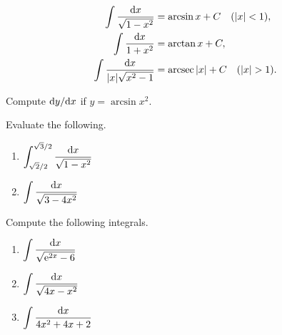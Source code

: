 \begin{corollary}
\begin{align}
\int \frac{\dee x}{\sqrt{1-x^2}} &= \arcsin x + C\quad (|x|<1),\\
\int \frac{\dee x}{1+x^2} &= \arctan x + C,\\
\int \frac{\dee x}{|x|\sqrt{x^2-1}} &= \arcsec|x| + C\quad (|x|>1).
\end{align}
\end{corollary}

\newpage

\begin{example}
Compute $\mathrm{d} y/\mathrm{d} x$ if $y=\arcsin x^2$.
\end{example}
\vfill

\begin{example}
Evaluate the following.
\begin{enumerate}
\item $\displaystyle\int_{\sqrt 2/2}^{\sqrt 3/2}\frac{\mathrm{d} x}{\sqrt{1-x^2}}$
\vfill
\item $\displaystyle\int\frac{\mathrm{d} x}{\sqrt{3-4x^2}}$
\vfill
\end{enumerate}
\end{example}

\newpage

\begin{example}
Compute the following integrals.
\begin{enumerate}
\item $\displaystyle\int\frac{\mathrm{d} x}{\sqrt{\mathrm{e}^{2x}-6}}$
\vfill
\item $\displaystyle\int\frac{\mathrm{d} x}{\sqrt{4x-x^2}}$
\vfill
\item $\displaystyle\int\frac{\mathrm{d} x}{4x^2+4x+2}$
\vfill
\end{enumerate}
\end{example}


